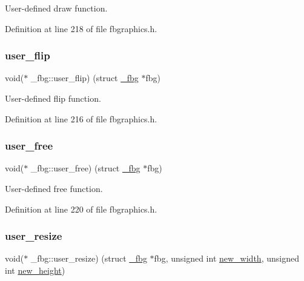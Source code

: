 User-\/defined draw function. 



Definition at line 218 of file fbgraphics.\+h.

\mbox{\label{struct__fbg_a3f2ad2eb06555cdbe2d18f541231cb37}} 
\subsubsection{\texorpdfstring{user\+\_\+flip}{user\_flip}}
{\footnotesize\ttfamily void($\ast$ \+\_\+fbg\+::user\+\_\+flip) (struct \mbox{\hyperlink{struct__fbg}{\+\_\+fbg}} $\ast$fbg)}



User-\/defined flip function. 



Definition at line 216 of file fbgraphics.\+h.

\mbox{\label{struct__fbg_a88d48b502672cfb8bd2c94ea3feac8d0}} 
\subsubsection{\texorpdfstring{user\+\_\+free}{user\_free}}
{\footnotesize\ttfamily void($\ast$ \+\_\+fbg\+::user\+\_\+free) (struct \mbox{\hyperlink{struct__fbg}{\+\_\+fbg}} $\ast$fbg)}



User-\/defined free function. 



Definition at line 220 of file fbgraphics.\+h.

\mbox{\label{struct__fbg_a68add70dac4b055809c1bcab1e65b18d}} 
\subsubsection{\texorpdfstring{user\+\_\+resize}{user\_resize}}
{\footnotesize\ttfamily void($\ast$ \+\_\+fbg\+::user\+\_\+resize) (struct \mbox{\hyperlink{struct__fbg}{\+\_\+fbg}} $\ast$fbg, unsigned int \mbox{\hyperlink{struct__fbg_a95859bd418a5cfff155cdb1421d295ef}{new\+\_\+width}}, unsigned int \mbox{\hyperlink{struct__fbg_a509aa5f8f0a94d8313bb4da777aa64bc}{new\+\_\+height}})}



